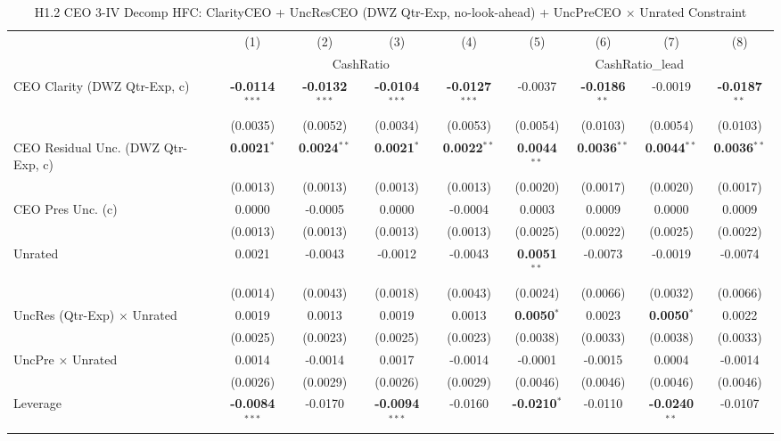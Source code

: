 \documentclass[11pt,a4paper]{article}
\begin{document}
\clearpage
\begin{table}[htbp]
\centering
\caption{H1.2 CEO 3-IV Decomp HFC: ClarityCEO + UncResCEO (DWZ Qtr-Exp, no-look-ahead) + UncPreCEO $\times$ Unrated Constraint}
\label{tab:h1_2_ceo2_decomp_qtrexp}
\scriptsize
\begin{tabular}{lcccccccc}
\toprule
 & (1) & (2) & (3) & (4) & (5) & (6) & (7) & (8) \\
 & \multicolumn{4}{c}{CashRatio} & \multicolumn{4}{c}{CashRatio\_lead} \\
\cmidrule(lr){2-5} \cmidrule(lr){6-9}
\midrule
CEO Clarity (DWZ Qtr-Exp, c) & \textbf{-0.0114}$^{***}$ & \textbf{-0.0132}$^{***}$ & \textbf{-0.0104}$^{***}$ & \textbf{-0.0127}$^{***}$ & -0.0037 & \textbf{-0.0186}$^{**}$ & -0.0019 & \textbf{-0.0187}$^{**}$ \\
 & (0.0035) & (0.0052) & (0.0034) & (0.0053) & (0.0054) & (0.0103) & (0.0054) & (0.0103) \\
CEO Residual Unc. (DWZ Qtr-Exp, c) & \textbf{0.0021}$^{*}$ & \textbf{0.0024}$^{**}$ & \textbf{0.0021}$^{*}$ & \textbf{0.0022}$^{**}$ & \textbf{0.0044}$^{**}$ & \textbf{0.0036}$^{**}$ & \textbf{0.0044}$^{**}$ & \textbf{0.0036}$^{**}$ \\
 & (0.0013) & (0.0013) & (0.0013) & (0.0013) & (0.0020) & (0.0017) & (0.0020) & (0.0017) \\
CEO Pres Unc. (c) & 0.0000 & -0.0005 & 0.0000 & -0.0004 & 0.0003 & 0.0009 & 0.0000 & 0.0009 \\
 & (0.0013) & (0.0013) & (0.0013) & (0.0013) & (0.0025) & (0.0022) & (0.0025) & (0.0022) \\
Unrated & 0.0021 & -0.0043 & -0.0012 & -0.0043 & \textbf{0.0051}$^{**}$ & -0.0073 & -0.0019 & -0.0074 \\
 & (0.0014) & (0.0043) & (0.0018) & (0.0043) & (0.0024) & (0.0066) & (0.0032) & (0.0066) \\
UncRes (Qtr-Exp) $\times$ Unrated & 0.0019 & 0.0013 & 0.0019 & 0.0013 & \textbf{0.0050}$^{*}$ & 0.0023 & \textbf{0.0050}$^{*}$ & 0.0022 \\
 & (0.0025) & (0.0023) & (0.0025) & (0.0023) & (0.0038) & (0.0033) & (0.0038) & (0.0033) \\
UncPre $\times$ Unrated & 0.0014 & -0.0014 & 0.0017 & -0.0014 & -0.0001 & -0.0015 & 0.0004 & -0.0014 \\
 & (0.0026) & (0.0029) & (0.0026) & (0.0029) & (0.0046) & (0.0046) & (0.0046) & (0.0046) \\
\midrule
Leverage & \textbf{-0.0084}$^{***}$ & -0.0170 & \textbf{-0.0094}$^{***}$ & -0.0160 & \textbf{-0.0210}$^{*}$ & -0.0110 & \textbf{-0.0240}$^{**}$ & -0.0107 \\

\end{tabular}
\end{table}
\end{document}
